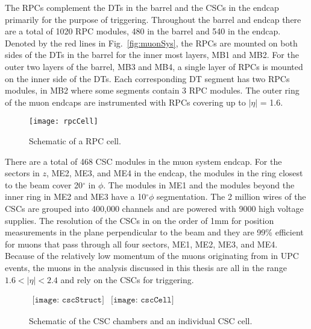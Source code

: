     The RPCs complement the DTs in the barrel and the CSCs in the endcap 
      primarily for the purpose of triggering.
    Throughout the barrel and endcap there are a total of 1020 RPC modules, 480
      in the barrel and 540 in the endcap.
    Denoted by the red lines in Fig.~\ref{fig:muonSys}, the RPCs are mounted on
      both sides of the DTs in the barrel for the inner most layers, MB1 and 
      MB2.
    For the outer two layers of the barrel, MB3 and MB4, a single layer of RPCs
      is mounted on the inner side of the DTs.
    Each corresponding DT segment has two RPCs modules, \DIFdelbegin {}\DIFdelend \DIFaddbegin {}\DIFaddend in MB2 where 
      some segments contain 3 RPC modules. 
    The outer ring of the muon endcaps are instrumented with RPCs covering up to
      $|\eta|$ = 1.6.
    \begin{figure}[!Hhbt]
      \centering
      \texttt{[image: rpcCell]}
      \caption{Schematic of a RPC cell.}
      \label{fig:rpcSchem}
    \end{figure}

    There are a total of 468 CSC modules in the muon system endcap. 
    For the sectors in $z$, ME2, ME3, and ME4 in the endcap, the modules in 
      the ring closest to the beam cover 20$^{\circ}$ in $\phi$.
    The modules in ME1 and the modules beyond the inner ring in
      ME2 and ME3 have a 10$^{\circ} \phi$ segmentation.
    The 2 million wires of the CSCs are grouped into 400,000 channels and are
      powered with 9000 high voltage supplies. 
    The resolution of the CSCs in on the order of 1mm for position measurements 
      in the plane perpendicular to the beam and they are 99\% efficient for muons
      that pass through all four sectors, ME1, ME2, ME3, and ME4.
    Because of the relatively low momentum of the muons originating from \JPsi{}
      in UPC events, the muons in the analysis discussed in this thesis are all
      in the range $1.6 < |\eta| < 2.4$ and rely on the CSCs for triggering. 
    \begin{figure}[!Hhbt]
      \centering
      $ \begin{array}{cc}
        \texttt{[image: cscStruct]} &
        \texttt{[image: cscCell]}
      \end{array} $
      \caption{Schematic of the CSC chambers and an individual CSC cell.}
      \label{fig:cscSchem}
    \end{figure}

